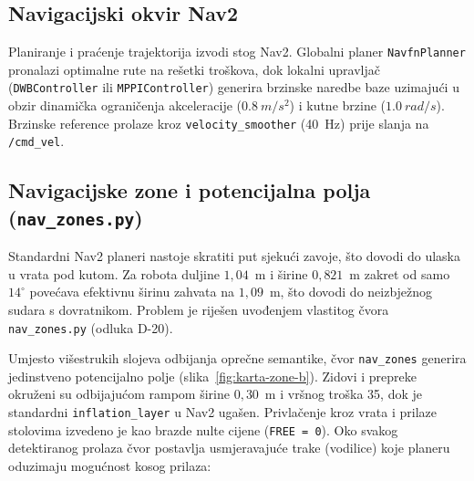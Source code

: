 \subsection{Navigacijski okvir Nav2}
\label{sec:06-nav2}

Planiranje i praćenje trajektorija izvodi stog Nav2. Globalni planer \texttt{NavfnPlanner}
pronalazi optimalne rute na rešetki troškova, dok lokalni upravljač (\texttt{DWBController} ili
\texttt{MPPIController}) generira brzinske naredbe baze uzimajući u obzir dinamička ograničenja
akceleracije ($\SI{0.8}{m/s^2}$) i kutne brzine ($\SI{1.0}{rad/s}$). Brzinske reference prolaze
kroz \texttt{velocity\_smoother} (40~Hz) prije slanja na \texttt{/cmd\_vel}.

\subsection{Navigacijske zone i potencijalna polja (\texttt{nav\_zones.py})}
\label{sec:06-zones}

Standardni Nav2 planeri nastoje skratiti put sjekući zavoje, što dovodi do ulaska u vrata pod kutom.
Za robota duljine $1{,}04$~m i širine $0{,}821$~m zakret od samo $14^\circ$ povećava efektivnu širinu
zahvata na $1{,}09$~m, što dovodi do neizbježnog sudara s dovratnikom. Problem je riješen uvođenjem
vlastitog čvora \texttt{nav\_zones.py} (odluka D-20).

Umjesto višestrukih slojeva odbijanja oprečne semantike, čvor \texttt{nav\_zones} generira
jedinstveno potencijalno polje (slika~\ref{fig:karta-zone-b}). Zidovi i prepreke okruženi su
odbijajućom rampom širine $0{,}30$~m i vršnog troška 35, dok je standardni \texttt{inflation\_layer}
u Nav2 ugašen. Privlačenje kroz vrata i prilaze stolovima izvedeno je kao brazde nulte cijene
(\texttt{FREE = 0}). Oko svakog detektiranog prolaza čvor postavlja usmjeravajuće trake (vodilice)
koje planeru oduzimaju mogućnost kosog prilaza:

